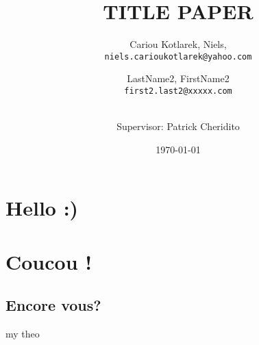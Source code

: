 \documentclass[10pt]{article}
\title{TITLE PAPER}
\author{
    Cariou Kotlarek, Niels,\\
    \texttt{niels.carioukotlarek@yahoo.com}
    \and
    LastName2, FirstName2\\
    \texttt{first2.last2@xxxxx.com}
    \and
    \\ Supervisor: Patrick Cheridito
}
\date{\today}
\begin{document}
    \maketitle
    \begin{abstract}
    \end{abstract}



    \section{Hello :)}


    \section{Coucou !}

    \subsection{Encore vous?}

    \lipsum


    \begin{definition}[my def]
        \lipsum
    \end{definition}


    \begin{theoreme}[label = thrm:X]{my theo}
        \lipsum
    \end{theoreme}

    \begin{demo}{}{}
        \lipsum
    \end{demo}

    \begin{ajoutationV}{}{}
        \lipsum
    \end{ajoutationV}



    \printbibliography[category=cited]%
    \printbibliography[title={Further Reading},notcategory=cited]
    \nocite{*}
\end{document}
